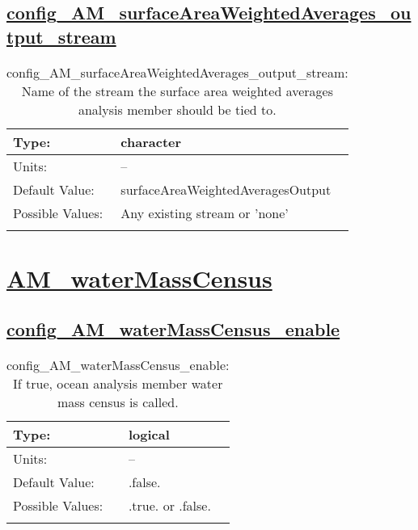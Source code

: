 \subsection[config\_AM\_surfaceAreaWeightedAverages\_output\_stream]{\hyperref[sec:nm_tab_AM_surfaceAreaWeightedAverages]{config\_AM\_surfaceAreaWeightedAverages\_output\_stream}}
\label{subsec:nm_sec_config_AM_surfaceAreaWeightedAverages_output_stream}
\begin{center}
\begin{longtable}{| p{2.0in} || p{4.0in} |}
    \hline
    Type: & character \\
    \hline
    Units: & -- \\
    \hline
    Default Value: & surfaceAreaWeightedAveragesOutput \\
    \hline
    Possible Values: & Any existing stream or 'none' \\
    \hline
    \caption{config\_AM\_surfaceAreaWeightedAverages\_output\_stream: Name of the stream the surface area weighted averages analysis member should be tied to.}
\end{longtable}
\end{center}
\section[AM\_waterMassCensus]{\hyperref[sec:nm_tab_AM_waterMassCensus]{AM\_waterMassCensus}}
\label{sec:nm_sec_AM_waterMassCensus}
\subsection[config\_AM\_waterMassCensus\_enable]{\hyperref[sec:nm_tab_AM_waterMassCensus]{config\_AM\_waterMassCensus\_enable}}
\label{subsec:nm_sec_config_AM_waterMassCensus_enable}
\begin{center}
\begin{longtable}{| p{2.0in} || p{4.0in} |}
    \hline
    Type: & logical \\
    \hline
    Units: & -- \\
    \hline
    Default Value: & .false. \\
    \hline
    Possible Values: & .true. or .false. \\
    \hline
    \caption{config\_AM\_waterMassCensus\_enable: If true, ocean analysis member water mass census is called.}
\end{longtable}
\end{center}

